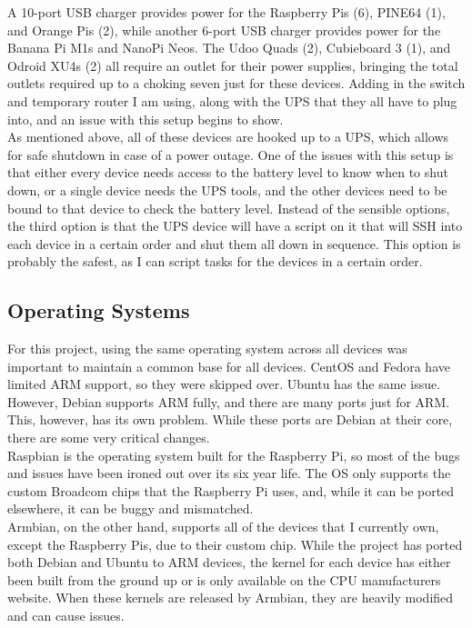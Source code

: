 \documentclass[12pt]{spieman}  %
\begin{document}
A 10-port USB charger provides power for the Raspberry Pis (6), PINE64 (1), and Orange Pis (2), while another 6-port USB charger provides power for the Banana Pi M1s and NanoPi Neos. The Udoo Quads (2), Cubieboard 3 (1), and Odroid XU4s (2) all require an outlet for their power supplies, bringing the total outlets required up to a choking seven just for these devices. Adding in the switch and temporary router I am using, along with the UPS that they all have to plug into, and an issue with this setup begins to show.\\

As mentioned above, all of these devices are hooked up to a UPS, which allows for safe shutdown in case of a power outage. One of the issues with this setup is that either every device needs access to the battery level to know when to shut down, or a single device needs the UPS tools, and the other devices need to be bound to that device to check the battery level. Instead of the sensible options, the third option is that the UPS device will have a script on it that will SSH into each device in a certain order and shut them all down in sequence. This option is probably the safest, as I can script tasks for the devices in a certain order.

\subsection{Operating Systems}
\label{subsec:oses}

For this project, using the same operating system across all devices was important to maintain a common base for all devices. CentOS and Fedora have limited ARM support, so they were skipped over. Ubuntu has the same issue. However, Debian supports ARM fully, and there are many ports just for ARM. This, however, has its own problem. While these ports are Debian at their core, there are some very critical changes.\\

Raspbian is the operating system built for the Raspberry Pi, so most of the bugs and issues have been ironed out over its six year life. The OS only supports the custom Broadcom chips that the Raspberry Pi uses, and, while it can be ported elsewhere, it can be buggy and mismatched.\\

Armbian, on the other hand, supports all of the devices that I currently own, except the Raspberry Pis, due to their custom chip. While the project has ported both Debian and Ubuntu to ARM devices, the kernel for each device has either been built from the ground up or is only available on the CPU manufacturers website. When these kernels are released by Armbian, they are heavily modified and can cause issues.\\
\end{document}
